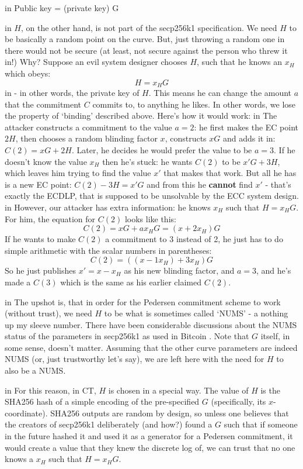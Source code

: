 \documentclass[10pt,a4paper]{article}
\begin{document}
 in \noindent Public key = (private key) \times G

 in \noindent $H$, on the other hand, is not part of the secp256k1 specification. We need $H$ to be basically a random point on the curve. But, just throwing a random one in there would not be secure (at least, not secure against the person who threw it in!) Why? Suppose an evil system designer chooses $H$, such that he knows an $x_H$ which obeys:
\[H = x_H G \]
 in \noindent - in other words, the private key of $H$. This means he can change the amount $a$ that the commitment $C$ commits to, to anything he likes. In other words, we lose the property of `binding' described above. Here's how it would work:
 in \noindent The attacker constructs a commitment to the value $a=2$: he first makes the EC point $2H$, then chooses a random blinding factor $x$, constructs $xG$ and adds it in: $C(2) = xG + 2H$. Later, he decides he would prefer the value to be $a=3$. If he doesn't know the value $x_H$ then he's stuck: he wants $C(2)$ to be $x'G + 3H$, which leaves him trying to find the value $x'$ that makes that work. But all he has is a new EC point: $C(2)-3H = x'G$ and from this he \textbf{cannot} find $x'$ - that's exactly the ECDLP, that is supposed to be unsolvable by the ECC system design.
 in \noindent However, our attacker has extra information: he knows $x_H$ such that $H = x_H G$. For him, the equation for $C(2)$ looks like this:
\[C(2) = xG + ax_{H}G = \left(x+2x_{H}\right)G \]
If he wants to make $C(2)$ a commitment to 3 instead of 2, he just has to do simple arithmetic with the scalar numbers in parentheses:
\[C(2) = \left(\left(x-1x_{H}\right) + 3x_{H}\right)G \]
So he just publishes $x' = x-x_H$ as his new blinding factor, and $a=3$, and he's made a $C(3)$ which is the same as his earlier claimed $C(2)$.

 in \noindent The upshot is, that in order for the Pedersen commitment scheme to work (without trust), we need $H$ to be what is sometimes called `NUMS' - a nothing up my sleeve number. There have been considerable discussions about the NUMS status of the parameters in secp256k1 as used in Bitcoin \cite{secp256k1_nums}. Note that $G$ itself, in some sense, doesn't matter. Assuming that the other curve parameters are indeed NUMS (or, just trustworthy let's say), we are left here with the need for $H$ to also be a NUMS.

 in \noindent For this reason, in CT, $H$ is chosen in a special way. The value of $H$ is the SHA256 hash of a simple encoding of the pre-specified $G$ (specifically, its $x$-coordinate). SHA256 outputs are random by design, so unless one believes that the creators of secp256k1 deliberately (and how?) found a $G$ such that if someone in the future hashed it and used it as a generator for a Pedersen commitment, it would create a value that they knew the discrete log of, we can trust that no one knows a $x_H$ such that $H = x_H  G$.
\end{document}
